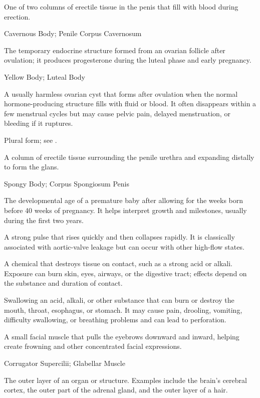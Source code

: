  One of two columns of erectile tissue in the penis that fill with blood during erection.

\synonyms
Cavernous Body; Penile Corpus Cavernosum

 The temporary endocrine structure formed from an ovarian follicle after ovulation; it produces progesterone during the luteal phase and early pregnancy.

\synonyms
Yellow Body; Luteal Body

 A usually harmless ovarian cyst that forms after ovulation when the normal hormone-producing structure fills with fluid or blood. It often disappears within a few menstrual cycles but may cause pelvic pain, delayed menstruation, or bleeding if it ruptures.

 Plural form; see .

 A column of erectile tissue surrounding the penile urethra and expanding distally to form the glans.

\synonyms
Spongy Body; Corpus Spongiosum Penis

 The developmental age of a premature baby after allowing for the weeks born before 40 weeks of pregnancy. It helps interpret growth and milestones, usually during the first two years.

 A strong pulse that rises quickly and then collapses rapidly. It is classically associated with aortic-valve leakage but can occur with other high-flow states.

 A chemical that destroys tissue on contact, such as a strong acid or alkali. Exposure can burn skin, eyes, airways, or the digestive tract; effects depend on the substance and duration of contact.

 Swallowing an acid, alkali, or other substance that can burn or destroy the mouth, throat, esophagus, or stomach. It may cause pain, drooling, vomiting, difficulty swallowing, or breathing problems and can lead to perforation.

 A small facial muscle that pulls the eyebrows downward and inward, helping create frowning and other concentrated facial expressions.

\synonyms
Corrugator Supercilii; Glabellar Muscle

 The outer layer of an organ or structure. Examples include the brain's cerebral cortex, the outer part of the adrenal gland, and the outer layer of a hair.

